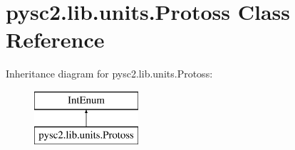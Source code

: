 \hypertarget{classpysc2_1_1lib_1_1units_1_1_protoss}{}\section{pysc2.\+lib.\+units.\+Protoss Class Reference}
\label{classpysc2_1_1lib_1_1units_1_1_protoss}
Inheritance diagram for pysc2.\+lib.\+units.\+Protoss\+:\begin{figure}[H]
\begin{center}
\leavevmode
\includegraphics[height=2.000000cm]{classpysc2_1_1lib_1_1units_1_1_protoss}
\end{center}
\end{figure}
